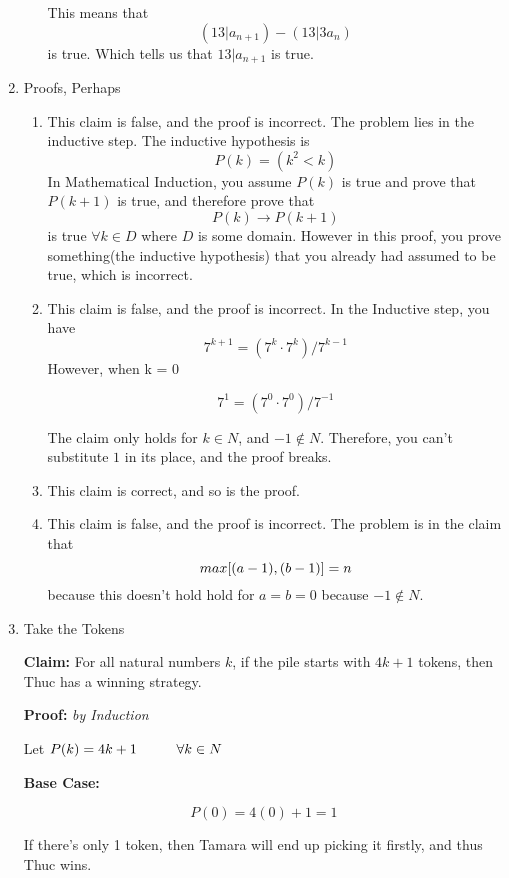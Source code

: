 \documentclass[11pt]{article}
\newcommand{\cmark}{\ding{51}}%
\newcommand\tab[1][1cm]{\hspace*{#1}}
\begin{document}
\begin{enumerate}
\begin{enumerate}
			This means that 
			$$(13 \vert a_{n+1}) - (13 \vert 3a_{n})$$ is true. Which tells us that $13 \vert a_{n+1}$ is true. \cmark
			
			
		\end{enumerate}
		
		\newpage
		\item Proofs, Perhaps
		
		\begin{enumerate}
			
			\item This claim is false, and the proof is incorrect. The problem lies in the inductive step. The inductive hypothesis is $$P(k) = (k^2 < k)$$ In Mathematical Induction, you assume $P(k)$ is true and prove that $P(k+1)$ is true, and therefore prove that $$P(k) \rightarrow P(k+1)$$ is true $\forall k \in D$ where $D$ is some domain. However in this proof, you prove something(the inductive hypothesis) that you already had assumed to be true, which is incorrect. 
			\item This claim is false, and the proof is incorrect. In the Inductive step, you have $$7^{k+1} = (7^k \cdot 7^k) / 7^{k-1}$$ However, when k = 0
			 
			$$7^1 = (7^0 \cdot 7^0) / 7^{-1}$$ 
			
			The claim only holds for $k \in N$, and $-1 \notin N$. Therefore, you can't substitute $1$ in its place, and the proof breaks. 
			 
			\item This claim is correct, and so is the proof. 
			\item This claim is false, and the proof is incorrect. The problem is in the claim that 
			$$ max\text[(a - 1),(b - 1)] = n$$ because this doesn't hold hold for $a = b = 0$ because $-1 \notin N$. 
		\end{enumerate}
		
		\newpage
		\item Take the Tokens
		
		\textbf{Claim:} For all natural numbers \(k\), if the pile starts with \(4k +
		1\) tokens, then Thuc has a winning strategy.
		
		\textbf{Proof:}  \textit{by Induction}
		
		Let $P(k) = 4k + 1 \tab \forall k \in N$
		
		\textbf{Base Case:} 
		
		$$P(0) = 4(0) + 1 = 1$$
		
		If there's only 1 token, then Tamara will end up picking it firstly, and thus Thuc wins. \\
		

\end{enumerate}
\end{document}

